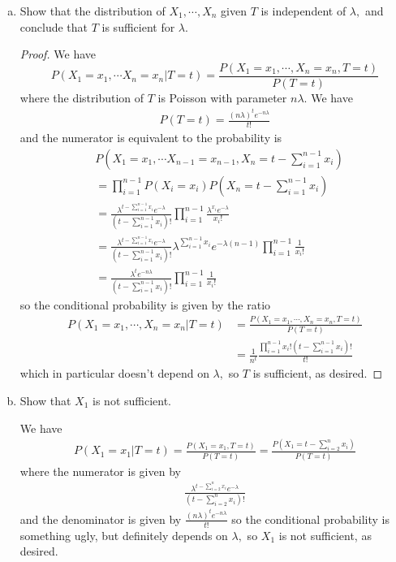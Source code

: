 \documentclass{article}
\begin{document}
\begin{itemize}
		\begin{enumerate}[a.]
			\item Show that the distribution of $X_1, \cdots, X_n$ given $T$ is independent of $\lambda,$ and conclude that $T$ is sufficient for $\lambda.$
				\begin{proof}
					We have \[P(X_1=x_1,\cdots X_n=x_n|T=t)=\frac{P(X_1=x_1, \cdots, X_n=x_n, T=t)}{P(T=t)}\] where the distribution of $T$ is Poisson with parameter $n\lambda.$ We have
					\begin{align*}
						P(T=t) = \frac{(n\lambda)^t e^{-n\lambda}}{t!}
					\end{align*} and the numerator is equivalent to the probability is
					\begin{align*}
						& P\left(X_1=x_1, \cdots X_{n-1}=x_{n-1}, X_n=t-\sum_{i=1}^{n-1}x_i\right) \\
						&= \prod_{i=1}^{n-1}P(X_i=x_i)P\left( X_n=t-\sum_{i=1}^{n-1}x_i \right) \\ 
						&=\frac{\lambda^{t-\sum_{i=1}^{n-1}x_i} e^{-\lambda}}{\left( t-\sum_{i=1}^{n-1}x_i \right)!} \prod_{i=1}^{n-1} \frac{\lambda^{x_i} e^{-\lambda}}{x_i!} \\
						&= \frac{\lambda^{t-\sum_{i=1}^{n-1}x_i} e^{-\lambda}}{\left( t-\sum_{i=1}^{n-1}x_i \right)!} \lambda^{\sum_{i=1}^{n-1} x_i} e^{-\lambda(n-1)} \prod_{i=1}^{n-1}\frac{1}{x_i!} \\
						&= \frac{\lambda^t e^{-n\lambda}}{\left(t-\sum_{i=1}^{n-1}x_i\right)!}\prod_{i=1}^{n-1}\frac{1}{x_i!}
					\end{align*} so the conditional probability is given by the ratio
					\begin{align*}
						P(X_1=x_1, \cdots, X_n=x_n|T=t) &= \frac{P(X_1=x_1, \cdots, X_n=x_n, T=t)}{P(T=t)} \\
						&= \frac{1}{n^t}\frac{\prod_{i=1}^{n-1}x_i! \left( t-\sum_{i=1}^{n-1} x_i \right)!}{t!}
					\end{align*} which in particular doesn't depend on $\lambda,$ so $T$ is sufficient, as desired.
					
				\end{proof}

			\item Show that $X_1$ is not sufficient.
				\begin{soln}
					We have 
					\begin{align*}
						P(X_1=x_1|T=t) = \frac{P(X_1=x_1, T=t)}{P(T=t)}=\frac{P\left( X_1=t-\sum_{i=2}^{n} x_i \right)}{P(T=t)} 
					\end{align*}
					where the numerator is given by
					\begin{align*}
						\frac{\lambda^{t-\sum_{i=2}^{n}x_i}e^{-\lambda}}{\left( t-\sum_{i=2}^{n}x_i \right)!}
					\end{align*} and the denominator is given by $\displaystyle \frac{(n\lambda)^t e^{-n\lambda}}{t!}$ so the conditional probability is something ugly, but definitely depends on $\lambda,$ so $X_1$ is not sufficient, as desired.


\end{soln}
\end{enumerate}
\end{itemize}
\end{document}
